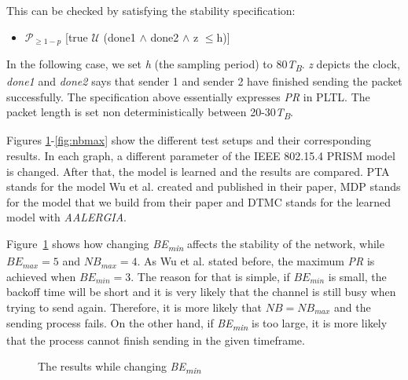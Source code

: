\documentclass[
a4paper,
12pt
]{scrartcl}
\begin{document}
This can be checked by satisfying the stability specification:

\begin{itemize}
  \item $\mathcal{P}_{\geq1-p}$ [true $\mathcal{U}$ (done1 $\land$ done2 $\land$ z $\leq$h)]
\end{itemize}

In the following case, we set \textit{h} (the sampling period) to 80\textit{T\textsubscript{B}}. \textit{z} depicts the clock, \textit{done1} and \textit{done2} says that sender 1 and sender 2 have finished sending the packet successfully. The specification above essentially expresses \textit{PR} in PLTL. The packet length is set non deterministically between 20-30\textit{T\textsubscript{B}}.

Figures \ref{fig:bemin}-\ref{fig:nbmax} show the different test setups and their corresponding results. In each graph, a different parameter of the IEEE 802.15.4 PRISM model is changed. After that, the model is learned and the results are compared. PTA stands for the model Wu et al. created and published in their paper, MDP stands for the model that we build from their paper and DTMC stands for the learned model with \emph{AALERGIA}.

Figure~\ref{fig:bemin} shows how changing \textit{BE\textsubscript{min}} affects the stability of the network, while $BE_{max}=5$ and $NB_{max}=4$. As Wu et al. stated before, the maximum \textit{PR} is achieved when $BE_{min}=3$. The reason for that is simple, if $BE_{min}$ is small, the backoff time will be short and it is very likely that the channel is still busy when trying to send again. Therefore, it is more likely that $NB=NB_{max}$ and the sending process fails. On the other hand, if \textit{BE\textsubscript{min}} is too large, it is more likely that the process cannot finish sending in the given timeframe.

\begin{figure}[H]
\centering
 \caption{The results while changing \textit{BE\textsubscript{min}}}
  \label{fig:bemin}
\end{figure}
\end{document}
